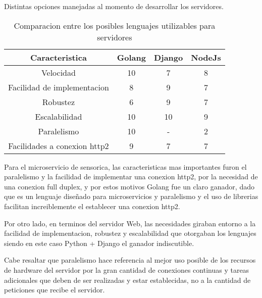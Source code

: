     \begin{table}[ht]
        \begin{center}
            Distintas opciones manejadas al momento de desarrollar los servidores.\\

            \vspace{0.3cm}
            \begin{tabular}{|c|c|c|c|}
                \hline
                Caracteristica              & Golang & Django & NodeJs\\\hline
                Velocidad                   & 10    & 7     &   8   \\\hline
                Facilidad de implementacion & 8     & 9     &  7\\\hline
                Robustez                    & 6     & 9     & 7 \\\hline
                Escalabilidad               & 10    & 10    & 9 \\\hline
                Paralelismo                 & 10    & -     & 2 \\\hline
                Facilidades a conexion http2& 9     &7      & 7 \\
                \hline
            \end{tabular}
        \end{center}
        \caption[Comparativa de posibles lenguajes nivel servidor]{Comparacion entre
        los posibles lenguajes utilizables para servidores}
        \label{tab:LenguajesServidor}
    \end{table}

    Para el microservicio de sensorica, las caracteristicas mas importantes furon
    el paralelismo y la facilidad de implementar una conexion http2, por la
    necesidad de una conexion full duplex, y por estos motivos Golang fue un claro
    ganador, dado que es un lenguaje diseñado para microservicios y paralelismo y
    el uso de librerias facilitan increiblemente el establecer una conexion http2.

    Por otro lado, en terminos del servidor Web, las necesidades giraban entorno
    a la facilidad de implementacion, robustez y escalabilidad que otorgaban los
    lenguajes siendo en este caso Python + Django el ganador indiscutible.


    Cabe resaltar que paralelismo hace referencia al mejor uso posible de los
    recursos de hardware del servidor por la gran cantidad de conexiones
    continuas y tareas adicionales que deben de ser realizadas y estar
    establecidas, no a la cantidad de peticiones que recibe el servidor.

